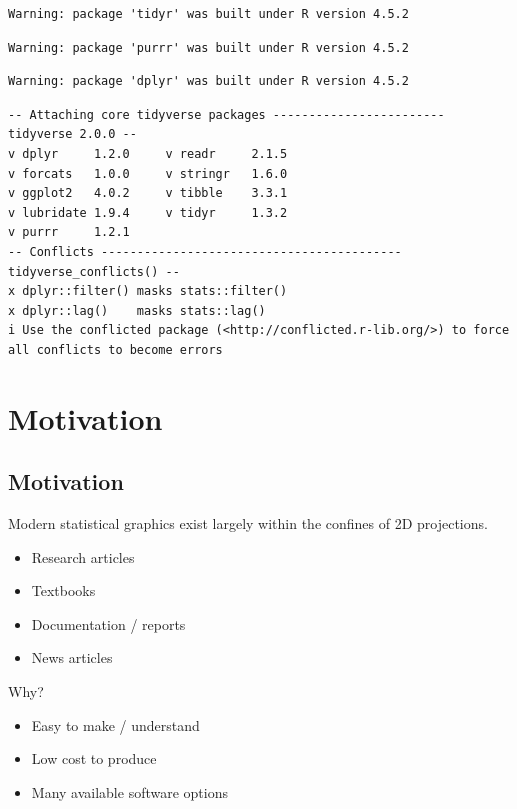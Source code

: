 \documentclass[phd]{nuthesis}
\begin{document}
\begin{verbatim}
Warning: package 'tidyr' was built under R version 4.5.2
\end{verbatim}

\begin{verbatim}
Warning: package 'purrr' was built under R version 4.5.2
\end{verbatim}

\begin{verbatim}
Warning: package 'dplyr' was built under R version 4.5.2
\end{verbatim}

\begin{verbatim}
-- Attaching core tidyverse packages ------------------------ tidyverse 2.0.0 --
v dplyr     1.2.0     v readr     2.1.5
v forcats   1.0.0     v stringr   1.6.0
v ggplot2   4.0.2     v tibble    3.3.1
v lubridate 1.9.4     v tidyr     1.3.2
v purrr     1.2.1     
-- Conflicts ------------------------------------------ tidyverse_conflicts() --
x dplyr::filter() masks stats::filter()
x dplyr::lag()    masks stats::lag()
i Use the conflicted package (<http://conflicted.r-lib.org/>) to force all conflicts to become errors
\end{verbatim}

\section{Motivation}\label{motivation}

\subsection{Motivation}\label{motivation-1}

Modern statistical graphics exist largely within the confines of 2D
projections.

\begin{itemize}
\tightlist
\item
  Research articles
\item
  Textbooks
\item
  Documentation / reports
\item
  News articles
\end{itemize}

Why?

\begin{itemize}
\tightlist
\item
  Easy to make / understand
\item
  Low cost to produce
\item
  Many available software options
\end{itemize}
\end{document}
